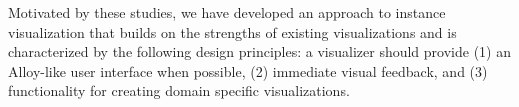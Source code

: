\documentclass[runningheads]{llncs}
\begin{document}

Motivated by these studies, we have developed an approach to instance visualization that builds on the strengths of existing visualizations and is characterized by the following design principles: a visualizer should provide (1) an Alloy-like user interface when possible, (2) immediate visual feedback, and (3) functionality for creating domain specific visualizations.

\end{document}

